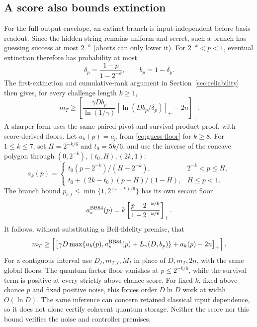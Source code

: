 \documentclass[11pt,a4paper]{article}
\numberwithin{equation}{section}
\theoremstyle{remark}\newtheorem*{remark}{Interpretation}
\newcommand{\positive}[1]{\left[#1\right]_+}
\begin{document}
\subsection{A score also bounds extinction}
For the full-output envelope, an extinct branch is input-independent before basis readout. Since the hidden string remains uniform and secret, such a branch has guessing success at most $2^{-k}$ (aborts can only lower it). For $2^{-k}<p<1$, eventual extinction therefore has probability at most
\begin{equation}
 \delta_p=\frac{1-p}{1-2^{-k}},\qquad b_p=1-\delta_p.
\end{equation}
The first-extinction and cumulative-rank argument in Section~\ref{sec:reliability} then gives, for every challenge length $k\ge1$,
\begin{equation}
 m_T\ge\positive{\frac{\gamma Db_p}{\ln(1/\gamma)}
 [\ln(Db_p/\delta_p)]_+-2n}.
\label{eq:score-reliability}
\end{equation}
A sharper form uses the same paired-pivot and survival-product proof, with score-derived floors. Let $a_k(p)=a_p$ from \eqref{eq:guess-floor} for $k\ge8$. For $1\le k\le7$, set $H=2^{-k/6}$ and $t_0=5k/6$, and use the inverse of the concave polygon through $(0,2^{-k}),(t_0,H),(2k,1)$:
\[
a_k(p)=\begin{cases}
t_0(p-2^{-k})/(H-2^{-k}),&2^{-k}<p\le H,\\
t_0+(2k-t_0)(p-H)/(1-H),&H\le p<1.
\end{cases}
\]
The branch bound $p_{b,t}\le\min\{1,2^{(s-k)/6}\}$ has its own secant floor
\[
a_s^{\rm BB84}(p)=k\positive{\frac{p-2^{-k/6}}{1-2^{-k/6}}}.
\]
It follows, without substituting a Bell-fidelity premise, that
\begin{equation}
m_T\ge\left\lceil\positive{
\gamma D\max\{a_k(p),a_s^{\rm BB84}(p)+L_\gamma(D,b_p)\}
+a_k(p)-2n}\right\rceil.
\label{eq:score-reliability-sharp}
\end{equation}
For a contiguous interval use $D_I,m_{T,I},M_I$ in place of $D,m_T,2n$, with the same global floors. The quantum-factor floor vanishes at $p\le2^{-k/6}$, while the survival term is positive at every strictly above-chance score. For fixed $k$, fixed above-chance $p$ and fixed positive noise, this forces order $D\ln D$ work at width $O(\ln D)$. The same inference can concern retained classical input dependence, so it does not alone certify coherent quantum storage. Neither the score nor this bound verifies the noise and controller premises.
\end{document}
